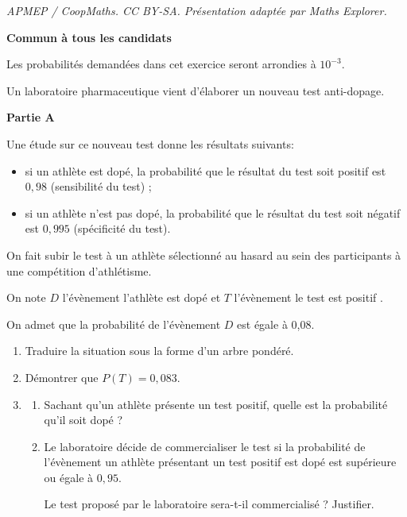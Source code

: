 \documentclass[10pt]{article}
\begin{document}
\noindent\textit{APMEP / CoopMaths. CC BY-SA. Présentation adaptée par Maths Explorer.}\par\medskip
\textbf{Commun à tous les candidats}

\medskip


Les probabilités demandées dans cet exercice seront arrondies à $10^{-3}$.

\medskip

Un laboratoire pharmaceutique vient d'élaborer un nouveau test anti-dopage. 

\bigskip

\textbf{Partie A}

\medskip

Une étude sur ce nouveau test donne les résultats suivants:

\setlength\parindent{9mm}
\begin{itemize}
\item[$\bullet~~$] si un athlète est dopé, la probabilité que le résultat du test soit positif est $0,98$ (sensibilité du test) ;
\item[$\bullet~~$]si un athlète n'est pas dopé, la probabilité que le résultat du test soit négatif est $0,995$ (spécificité du test).
\end{itemize}
\setlength\parindent{0mm}

\smallskip

On fait subir le test à un athlète sélectionné au hasard au sein des participants à une compétition d'athlétisme. 

On note $D$ l'évènement \og l'athlète est dopé \fg{} et $T$ l'évènement \og le test est positif \fg. 

On admet que la probabilité de l'évènement $D$ est égale à 0,08.

\medskip

\begin{enumerate}
\item Traduire la situation sous la forme d'un arbre pondéré.
\item Démontrer que $P(T) = 0,083$.
\item 
	\begin{enumerate}
		\item Sachant qu'un athlète présente un test positif, quelle est la probabilité qu'il soit dopé ?
		\item Le laboratoire décide de commercialiser le test si la probabilité de l'évènement \og un athlète présentant un test positif est dopé \fg{} est supérieure ou égale à $0,95$.

Le test proposé par le laboratoire sera-t-il commercialisé ? Justifier.
	\end{enumerate}
\end{enumerate}
\end{document}
